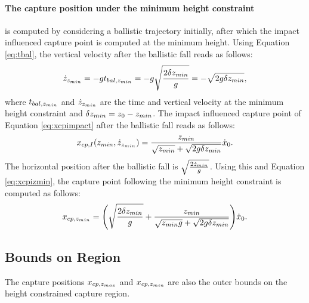 \paragraph{The capture position under the minimum height constraint} is computed by considering a ballistic trajectory initially, after which the impact influenced capture point is computed at the minimum height. Using Equation \ref{eq:tbal}, the vertical velocity after the ballistic fall reads as follows:
\begin{equation}
	\dot{z}_{z_{min}} = -gt_{bal,z_{min}} = -g\sqrt{\frac{2\delta{z_{min}}}{g}} = -\sqrt{2g\delta{z_{min}}},
\end{equation}
where $t_{bal,z_{min}}$ and $\dot{z}_{z_{min}}$ are the time and vertical velocity at the minimum height constraint and $\delta{z_{min}}=z_0-z_{min}$. The impact influenced capture point of Equation \eqref{eq:xcpimpact} after the ballistic fall reads as follows:
\begin{equation}
\label{eq:xcpizmin}
	x_{cp,I}(z_{min}, \dot{z}_{z_{min}})= \frac{z_{min}}{\sqrt{z_{min}}+\sqrt{2g\delta{z_{min}}}}\dot{x}_0.
\end{equation} 
The horizontal position after the ballistic fall is $\sqrt{\frac{2\dot{z}_{min}}{g}}$. Using this and Equation \ref{eq:xcpizmin}, the capture point following the minimum height constraint is computed as follows:
\begin{equation}
 x_{cp,z_{min}}=\Bigg(\sqrt{\frac{2\delta{z_{min}}}{g}} +\frac{z_{min}}{\sqrt{z_{min} g}+\sqrt{2g\delta{z_{min}}}}\Bigg)\dot{x}_0.
\end{equation}

\subsection{Bounds on Region}
The capture positions $x_{cp,z_{max}}$ and $x_{cp,z_{min}}$ are also the outer bounds on the height constrained capture region.

